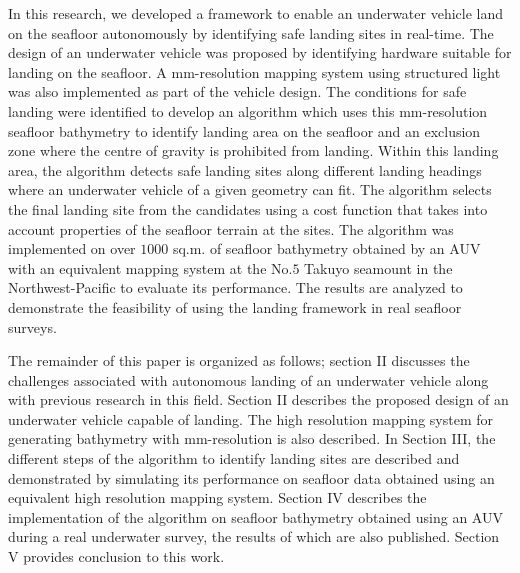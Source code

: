 In this research, we developed a framework to enable an underwater vehicle land on the seafloor autonomously by identifying safe landing sites in real-time. 
	The design of an underwater vehicle was proposed by identifying hardware
	suitable for landing on the seafloor. A mm-resolution mapping system using 
	structured light was also implemented as part of the vehicle design. The 
	conditions for safe landing were identified to develop an algorithm which 
	uses this mm-resolution seafloor bathymetry to identify landing area on 
	the seafloor and an exclusion zone where the centre of gravity is 
	prohibited from landing. Within this landing area, the algorithm detects 
	safe landing sites along different landing headings where an underwater 
	vehicle of a given geometry can fit. The algorithm selects the final landing 
	site from the candidates using a cost function that takes into account 
	properties of the seafloor terrain at the sites. The algorithm was 
	implemented on over $1000$ sq.m. of seafloor bathymetry obtained by an AUV 
	with an equivalent mapping system at the No.$5$ Takuyo seamount in the 
	Northwest-Pacific to evaluate its performance. The results are analyzed to 
	demonstrate the feasibility of using the landing framework in real seafloor 
	surveys.
	
The remainder of this paper is organized as follows; section II discusses the challenges associated with autonomous landing of an underwater vehicle along with previous research in this field. Section II describes the proposed design of an underwater vehicle capable of landing. The high resolution mapping system for generating bathymetry with mm-resolution is also described. In  Section III, the different steps of the algorithm to identify landing sites are described and demonstrated by simulating its performance on seafloor data obtained using an equivalent high resolution mapping system.  Section IV describes the implementation of the algorithm on seafloor bathymetry obtained using an AUV during a real underwater survey, the results of which are also published. Section V provides conclusion to this work. 
